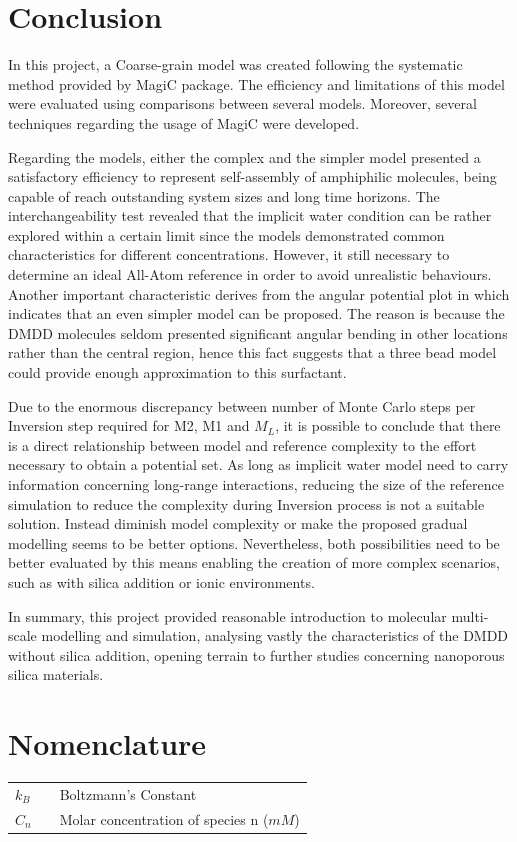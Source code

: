 \documentclass[10pt,a4paper,twoside]{article}
\begin{document}
\section{Conclusion}
In this  project, a Coarse-grain model was created following the systematic method provided by MagiC package. The efficiency and limitations of this model were evaluated using comparisons between several models. Moreover, several techniques regarding the usage of MagiC were developed.

Regarding the models, either the complex and the simpler model presented a satisfactory efficiency to represent self-assembly of amphiphilic molecules, being capable of reach outstanding system sizes and long time horizons. The interchangeability test revealed that the implicit water condition can be rather explored within a certain limit since the models demonstrated common characteristics for different concentrations. However, it still necessary to determine an ideal All-Atom reference in order to avoid unrealistic behaviours. Another important characteristic derives from the angular potential plot in which indicates that an even simpler model can be proposed. The reason is because the DMDD molecules seldom presented significant angular bending in other locations rather than the central region, hence this fact suggests that a three bead model could provide enough approximation to this surfactant.
 
 Due to the enormous discrepancy between number of Monte Carlo steps per Inversion step required for M2, M1 and $M_L$, it is possible to conclude that there is a direct relationship between model and reference complexity to the effort necessary to obtain a potential set. As long as implicit water model need to carry information concerning long-range interactions, reducing the size of the reference simulation to reduce the complexity  during Inversion process is not a suitable solution. Instead diminish model complexity or make the proposed gradual modelling seems to be better options. Nevertheless, both possibilities need to be better evaluated by this means enabling the creation of more complex scenarios, such as with silica addition or ionic environments.
 
 In summary, this project provided reasonable introduction to molecular multi-scale modelling and simulation, analysing vastly the characteristics of the DMDD without silica addition, opening terrain to further studies concerning nanoporous silica materials.
 
\section{Nomenclature} 
   \begin{tabulary}{1.0\textwidth}{LCL}
   $k_B$ & & Boltzmann's Constant\\
   $C_n$ &   & Molar concentration of species n ($mM$) \\
   \end{tabulary}
\end{document}
